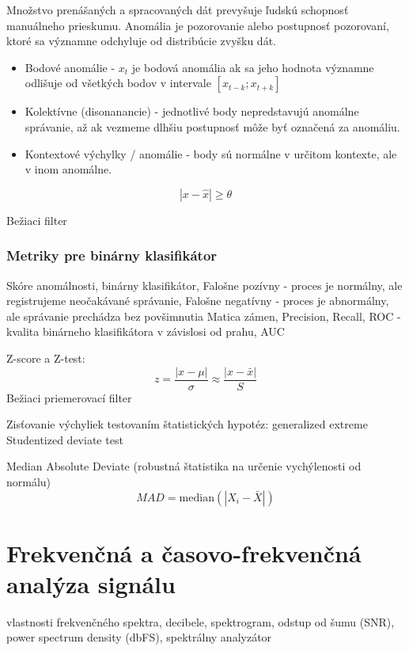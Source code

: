\cite{survey-univariate-time-series}
Množstvo prenášaných a spracovaných dát prevyšuje ľudskú schopnosť manuálneho prieskumu. Anomália je pozorovanie alebo postupnosť pozorovaní, ktoré sa významne odchyluje od distribúcie zvyšku dát.
\begin{itemize}
	\item Bodové anomálie - $x_t$ je bodová anomália ak sa jeho hodnota významne odlišuje od všetkých
		bodov v intervale $ [x_{t-k}; x_{t+k}] $
	\item Kolektívne (disonanancie) - jednotlivé body nepredstavujú anomálne správanie, až ak vezmeme dlhšiu postupnosť môže byť označená za anomáliu.
	\item Kontextové výchylky / anomálie - body sú normálne v určitom kontexte, ale v inom anomálne.
\end{itemize}

\cite{review-outlier-datection} \cite{anomaly-detection-algorithms}
\begin{equation}
|x - \hat{x}| \geq \theta
\end{equation}

Bežiaci filter
\cite{anomaly-detection-models}

\subsubsection{Metriky pre binárny klasifikátor}
Skóre anomálnosti, 	binárny klasifikátor,
Falošne pozívny - proces je normálny, ale registrujeme neočakávané správanie,
Falošne negatívny - proces je abnormálny, ale správanie prechádza bez povšimnutia
Matica zámen, Precision, Recall,
ROC - kvalita binárneho klasifikátora v závislosi od prahu, AUC
\cite{wsn-outlier-detection-survey}

Z-score a Z-test:
\begin{equation}
z = \frac{|x - \mu|}{\sigma} \approx \frac{|x - \bar{x}|}{S}
\end{equation}
Bežiaci priemerovací filter \cite{anomaly-detection-models}

Zisťovanie výchyliek testovaním štatistických hypotéz:
generalized extreme Studentized deviate test \cite{generalized-esd}

Median Absolute Deviate (robustná štatistika na určenie vychýlenosti od normálu)
\begin{equation}
MAD = \mathrm{median}(|X_i - \bar{X}|)
\end{equation}


\section{Frekvenčná a časovo-frekvenčná analýza signálu}
\cite{time-series-analysis}
vlastnosti frekvenčného spektra, decibele, spektrogram, odstup od šumu (SNR), power spectrum density (dbFS), spektrálny analyzátor

